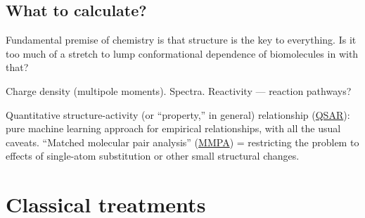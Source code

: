 \documentclass[notitlepage,openany,11pt]{report}
\theoremstyle{plain}%
\numberwithin{equation}{section}
\begin{document}
\subsection{What to calculate?}
Fundamental premise of chemistry is that structure is the key to everything. Is it too much of a stretch to lump conformational dependence of biomolecules in with that?

Charge density (multipole moments). Spectra. Reactivity --- reaction pathways? 

Quantitative structure-activity (or ``property,'' in general) relationship (\href{https://en.wikipedia.org/wiki/Quantitative_structure\%E2\%80\%93activity_relationship}{QSAR}): pure machine learning approach for empirical relationships, with all the usual caveats. ``Matched molecular pair analysis'' (\href{https://en.wikipedia.org/wiki/Matched_molecular_pair_analysis}{MMPA}) = restricting the problem to effects of single-atom substitution or other small structural changes.


\section{Classical treatments}
\end{document}
